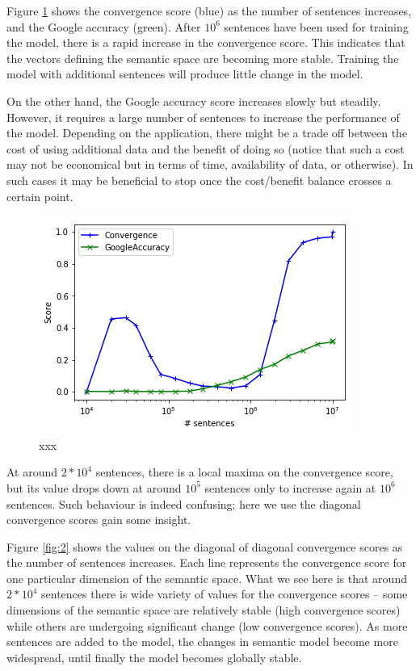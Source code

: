\documentclass{article} %
\begin{document}
Figure \ref{fig:1} shows the convergence score (blue) as the number of sentences increases, and the Google accuracy (green). After $10^6$ sentences have been used for training the model, there is a rapid increase in the convergence score. This indicates that the vectors defining the semantic space are becoming more stable. Training the model with additional sentences will produce little change in the model.

On the other hand, the Google accuracy score increases slowly but steadily. However, it requires a large number of sentences to increase the performance of the model. Depending on the application, there might be a trade off between the cost of using additional data and the benefit of doing so (notice that such a cost may not be economical but in terms of time, availability of data, or otherwise). In such cases it may be beneficial to stop once the cost/benefit balance crosses a certain point.

\begin{figure}
 \includegraphics[scale=1]{figure1.png} 
 \caption{xxx}
 \label{fig:1}
\end{figure}

At around $2 * 10^4$ sentences, there is a local maxima on the convergence score, but its value drops down at around $10^5$ sentences only to increase again at $10^6$ sentences. Such behaviour is indeed confusing; here we use the diagonal convergence scores gain some insight.

Figure \ref{fig:2} shows the values on the diagonal of diagonal convergence scores as the number of sentences increases. Each line represents the convergence score for one particular dimension of the semantic space. What we see here is that around $2 * 10^4$ sentences there is wide variety of values for the convergence scores -- some dimensions of the semantic space are relatively stable (high convergence scores) while others are undergoing significant change (low convergence scores). As more sentences are added to the model, the changes in semantic model become more widespread, until finally the model becomes globally stable.
\end{document}
